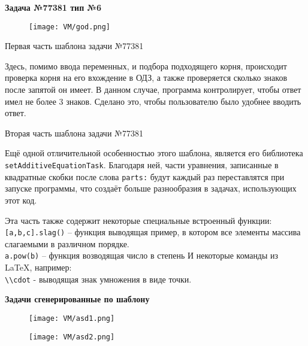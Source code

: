 \textbf{Задача №77381 тип №6}

\begin{figure}[h]
	\centering
	\texttt{[image: VM/god.png]}
\end{figure}

Первая часть шаблона задачи №77381
 
Здесь, помимо ввода переменных, и подбора подходящего корня, происходит проверка корня на его вхождение в ОДЗ, а также проверяется сколько знаков после запятой он имеет. В данном случае, программа контролирует, чтобы ответ имел не более 3 знаков. Сделано это, чтобы пользователю было удобнее вводить ответ.



Вторая часть шаблона задачи №77381

Ещё одной отличительной особенностью этого шаблона, является его библиотека \texttt{setAdditiveEquationTask}. Благодаря ней, части уравнения, записанные в квадратные скобки после слова \texttt{parts:} будут каждый раз переставлятся при запуске программы, что создаёт больше разнообразия в задачах, использующих этот код.

Эта часть также содержит некоторые специальные встроенный функции:
\\ \texttt{[a,b,c].slag()} – функция выводящая пример, в котором все элементы массива слагаемыми в различном порядке.
\\ \texttt{a.pow(b)} – функция возводящая число в степень
И некоторые команды из LaTeX, например: 
\\  \texttt{\textbackslash \textbackslash cdot} - выводящая знак умножения в виде точки.



\newpage

\textbf{Задачи сгенерированные по шаблону}

\begin{figure}[h]
	\centering
	\texttt{[image: VM/asd1.png]}
	\end{figure}
	\begin{figure}[h]
	\centering
	\texttt{[image: VM/asd2.png]}
\end{figure}
